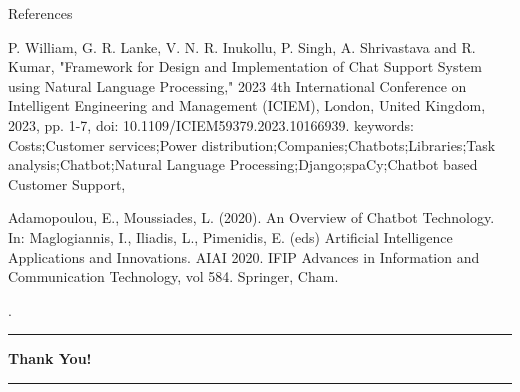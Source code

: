 \documentclass{beamer}
\begin{document}
\begin{frame}[t]{References}
\begin{thebibliography}{9}
P. William, G. R. Lanke, V. N. R. Inukollu, P. Singh, A. Shrivastava and R. Kumar, "Framework for Design and Implementation of Chat Support System using Natural Language Processing," 2023 4th International Conference on Intelligent Engineering and Management (ICIEM), London, United Kingdom, 2023, pp. 1-7, doi: 10.1109/ICIEM59379.2023.10166939. keywords: {Costs;Customer services;Power distribution;Companies;Chatbots;Libraries;Task analysis;Chatbot;Natural Language Processing;Django;spaCy;Chatbot based Customer Support},

Adamopoulou, E., Moussiades, L. (2020). An Overview of Chatbot Technology. In: Maglogiannis, I., Iliadis, L., Pimenidis, E. (eds) Artificial Intelligence Applications and Innovations. AIAI 2020. IFIP Advances in Information and Communication Technology, vol 584. Springer, Cham. 

\end{thebibliography}
\end{frame}

\begin{frame}[t]{.}
    \centering
    \vspace{1cm}
    \textbf{\Huge{}}
    
    \vspace{0.5cm}
    \rule{0.5\textwidth}{0.5mm} %

    \vspace{1cm}
    \textbf{\Large{Thank You!}}

    \vspace{0.5cm}
    \rule{0.5\textwidth}{0.5mm} %
\end{frame}
\end{document}
